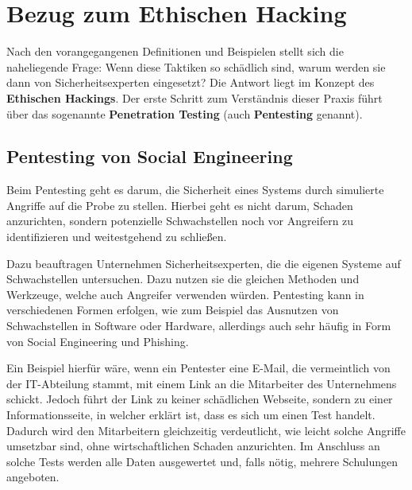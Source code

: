 \documentclass[12pt, a4paper, oneside]{scrartcl}
\begin{document}
\section{Bezug zum Ethischen Hacking}
Nach den vorangegangenen Definitionen und Beispielen stellt sich die naheliegende Frage: Wenn diese Taktiken
so schädlich sind, warum werden sie dann von Sicherheitsexperten eingesetzt? Die Antwort liegt im Konzept
des \textbf{Ethischen Hackings}. Der erste Schritt zum Verständnis dieser Praxis führt über das sogenannte
\textbf{Penetration Testing} (auch \textbf{Pentesting} genannt).

\subsection{Pentesting von Social Engineering}
Beim Pentesting geht es darum, die Sicherheit eines Systems durch simulierte Angriffe auf die 
Probe zu stellen. Hierbei geht es nicht darum, Schaden anzurichten, sondern potenzielle Schwachstellen
noch vor Angreifern zu identifizieren und weitestgehend zu schließen.
\par
Dazu beauftragen Unternehmen Sicherheitsexperten, die die eigenen Systeme auf Schwachstellen untersuchen.
Dazu nutzen sie die gleichen Methoden und Werkzeuge, welche auch Angreifer verwenden würden. Pentesting kann
in verschiedenen Formen erfolgen, wie zum Beispiel das Ausnutzen von Schwachstellen in Software oder Hardware,
allerdings auch sehr häufig in Form von Social Engineering und Phishing.
\par
Ein Beispiel hierfür wäre, wenn ein Pentester eine E-Mail, die vermeintlich von der IT-Abteilung stammt,
mit einem Link an die Mitarbeiter des Unternehmens schickt. Jedoch führt der Link zu keiner schädlichen Webseite, sondern
zu einer Informationsseite, in welcher erklärt ist, dass es sich um einen Test handelt. Dadurch wird 
den Mitarbeitern gleichzeitig verdeutlicht, wie leicht solche Angriffe umsetzbar sind, ohne wirtschaftlichen Schaden
anzurichten. Im Anschluss an solche Tests werden alle Daten ausgewertet und, falls nötig, mehrere Schulungen angeboten.
\end{document}
